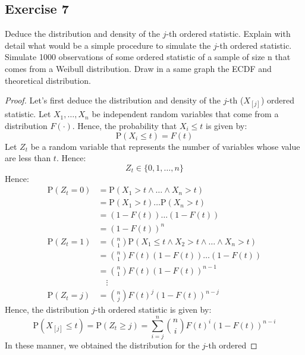 \documentclass[11pt]{article}
\theoremstyle{definition}
\theoremstyle{remark}
\theoremstyle{remark}
\renewcommand{\P}[1]{\mathrm{P}\left(#1 \right)}
\begin{document}
\subsection*{Exercise 7}
\label{subsec:7}
Deduce the distribution and density of the $j$-th ordered
statistic. Explain with detail what would be a simple procedure to
simulate the $j$-th ordered statistic. Simulate 1000 observations of
some ordered statistic of a sample of size n that comes from a Weibull
distribution. Draw in a same graph the ECDF and theoretical
distribution.

\begin{proof}
  Let's first deduce the distribution and density of the $j$-th
  ($X_{[j]}$) ordered statistic. Let $X_1, \ldots, X_n$ be independent
  random variables that come from a distribution $F(\cdot)$. Hence,
  the probability that $X_i \le t$ is given by:
  \begin{equation*}
    \P{X_i \le t} = F(t)
  \end{equation*}
  Let $Z_t$ be a random variable that represents the number of
  variables whose value are less than $t$. Hence:
  \begin{equation*}
    Z_t \in \{0, 1, \ldots, n\}
  \end{equation*}
  Hence:
  \begin{align*}
    \P{Z_t = 0} &= \P{X_1 > t \wedge \ldots \wedge X_n>t} \\
                &= \P{X_1 > t} \ldots \P{X_n > t} \\
                &= (1 - F(t))\ldots (1 - F(t)) \\
                &= (1 - F(t))^n \\
    \P{Z_t = 1} &= \binom{n}{1} \P{X_1 \le t \wedge X_2 > t \wedge \ldots \wedge X_n > t} \\
                &=\binom{n}{1} F(t) (1 - F(t)) \ldots (1 - F(t)) \\
                &= \binom{n}{1} F(t) (1 - F(t))^{n-1} \\
                &\quad \vdots \\
    \P{Z_t = j} &= \binom{n}{j} F(t)^j (1 - F(t))^{n - j}
  \end{align*}
  Hence, the distribution $j$-th ordered statistic is given by:
  \begin{equation*}
    \label{eq:jth}
    \P{X_{[j]} \le t} = \P{Z_t \ge j} = \sum_{i=j}^n \binom{n}{i} F(t)^i (1 - F(t))^{n - i}
  \end{equation*}
  In these manner, we obtained the distribution for the $j$-th ordered

\end{proof}
\end{document}
